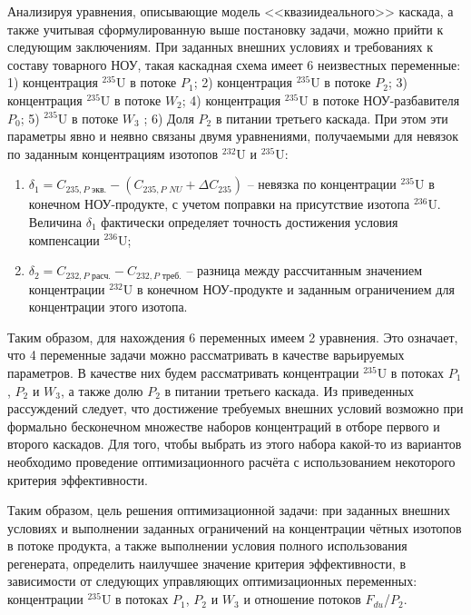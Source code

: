 Анализируя уравнения, описывающие модель <<квазиидеального>> каскада, а также учитывая сформулированную выше постановку задачи, можно прийти к следующим заключениям. При заданных внешних условиях и требованиях к составу товарного НОУ, такая каскадная схема имеет 6 неизвестных переменные: 1) концентрация $^{235}$U в потоке $P_{1}$; 2) концентрация $^{235}$U в потоке $P_{2}$; 3) концентрация $^{235}$U в потоке $W_{2}$; 4) концентрация $^{235}$U в потоке НОУ-разбавителя $P_{0}$; 5) $^{235}$U в потоке $W_{3}$ ; 6) Доля $P_2$ в питании третьего каскада. При этом эти параметры явно и неявно связаны двумя уравнениями, получаемыми для невязок по заданным концентрациям изотопов $^{232}$U и $^{235}$U:

\begin{enumerate}
    \item $\delta_{1}=C_{235,P\textit{ экв.}}-(C_{235,P\textit{ NU}}+\Delta C_{235})$ -- невязка по концентрации $^{235}$U в конечном НОУ-продукте, с учетом поправки на присутствие изотопа $^{236}$U. Величина $\delta_{1}$ фактически определяет точность достижения условия компенсации $^{236}$U;
    \item $\delta_{2}=C_{232,P\textit{ расч.}}-C_{232,P\textit{ треб.}}$ -- разница между рассчитанным значением концентрации $^{232}$U в конечном НОУ-продукте и заданным ограничением для концентрации этого изотопа.
\end{enumerate}

Таким образом, для нахождения 6 переменных имеем 2 уравнения. Это означает, что 4 переменные задачи можно рассматривать в качестве варьируемых параметров. В качестве них будем рассматривать концентрации $^{235}$U в потоках $P_{1}$, $P_{2}$ и $W_{3}$, а также долю $P_2$ в питании третьего каскада. Из приведенных рассуждений следует, что достижение требуемых внешних условий возможно при формально бесконечном множестве наборов концентраций в отборе первого и второго каскадов. Для того, чтобы выбрать из этого набора какой-то из вариантов необходимо проведение оптимизационного расчёта с использованием некоторого критерия эффективности.

Таким образом, цель решения оптимизационной задачи: при заданных внешних условиях и выполнении заданных ограничений на концентрации чётных изотопов в потоке продукта, а также выполнении условия полного использования регенерата, определить наилучшее значение критерия эффективности, в зависимости от следующих управляющих оптимизационных переменных: концентрации $^{235}$U в потоках $P_1$, $P_2$ и $W_3$ и отношение потоков $F_{du}$/$P_2$.


